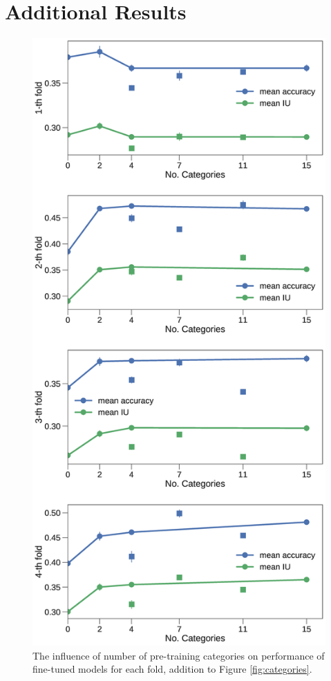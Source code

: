 \section{Additional Results}
\begin{figure}[t]
\centering
   \includegraphics[width=\linewidth]{img/num_classes_folds.eps}
\caption{The influence of number of pre-training categories on performance of fine-tuned models for each fold, addition to Figure \ref{fig:categories}.}
\label{fig:classesfold}
\end{figure}
